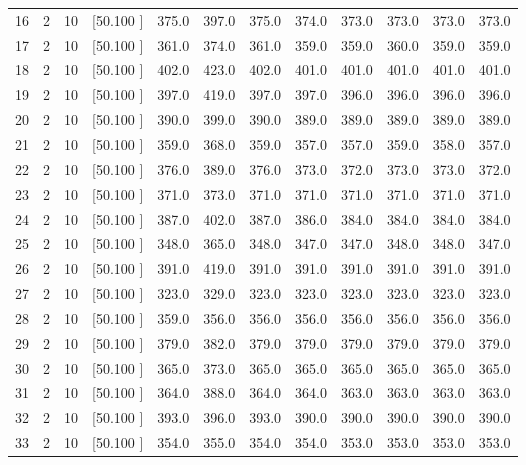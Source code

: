 \documentclass[12pt,a4paper]{article}
\begin{document}
\begin{center}
{\begin{tabular}{r r r r r r r r r r r r}
  16&  2& 10&[50.100    ]&   375.0&   397.0&   375.0&   374.0&   373.0&   373.0&   373.0&   373.0\\[-0.02in]
  17&  2& 10&[50.100    ]&   361.0&   374.0&   361.0&   359.0&   359.0&   360.0&   359.0&   359.0\\[-0.02in]
  18&  2& 10&[50.100    ]&   402.0&   423.0&   402.0&   401.0&   401.0&   401.0&   401.0&   401.0\\[-0.02in]
  19&  2& 10&[50.100    ]&   397.0&   419.0&   397.0&   397.0&   396.0&   396.0&   396.0&   396.0\\[-0.02in]
  20&  2& 10&[50.100    ]&   390.0&   399.0&   390.0&   389.0&   389.0&   389.0&   389.0&   389.0\\[-0.02in]
  21&  2& 10&[50.100    ]&   359.0&   368.0&   359.0&   357.0&   357.0&   359.0&   358.0&   357.0\\[-0.02in]
  22&  2& 10&[50.100    ]&   376.0&   389.0&   376.0&   373.0&   372.0&   373.0&   373.0&   372.0\\[-0.02in]
  23&  2& 10&[50.100    ]&   371.0&   373.0&   371.0&   371.0&   371.0&   371.0&   371.0&   371.0\\[-0.02in]
  24&  2& 10&[50.100    ]&   387.0&   402.0&   387.0&   386.0&   384.0&   384.0&   384.0&   384.0\\[-0.02in]
  25&  2& 10&[50.100    ]&   348.0&   365.0&   348.0&   347.0&   347.0&   348.0&   348.0&   347.0\\[-0.02in]
  26&  2& 10&[50.100    ]&   391.0&   419.0&   391.0&   391.0&   391.0&   391.0&   391.0&   391.0\\[-0.02in]
  27&  2& 10&[50.100    ]&   323.0&   329.0&   323.0&   323.0&   323.0&   323.0&   323.0&   323.0\\[-0.02in]
  28&  2& 10&[50.100    ]&   359.0&   356.0&   356.0&   356.0&   356.0&   356.0&   356.0&   356.0\\[-0.02in]
  29&  2& 10&[50.100    ]&   379.0&   382.0&   379.0&   379.0&   379.0&   379.0&   379.0&   379.0\\[-0.02in]
  30&  2& 10&[50.100    ]&   365.0&   373.0&   365.0&   365.0&   365.0&   365.0&   365.0&   365.0\\[-0.02in]
  31&  2& 10&[50.100    ]&   364.0&   388.0&   364.0&   364.0&   363.0&   363.0&   363.0&   363.0\\[-0.02in]
  32&  2& 10&[50.100    ]&   393.0&   396.0&   393.0&   390.0&   390.0&   390.0&   390.0&   390.0\\[-0.02in]
  33&  2& 10&[50.100    ]&   354.0&   355.0&   354.0&   354.0&   353.0&   353.0&   353.0&   353.0\\[-0.02in]

\end{tabular}}
\end{center}
\end{document}
